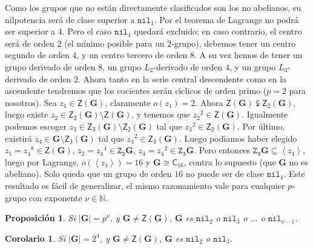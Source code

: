 \documentclass[final,12pt,a4paper,twoside,fleqn]{extbook}
\newcommand{\entreparentesis}[1]{\ensuremath{
        \left({#1}\right)
}}
\newcommand{\entreangulos}[1]{\ensuremath{\left\langle{#1}\right\rangle}}
\newcommand{\setN}{\ensuremath{\mathds{N}}}
\newcommand{\generadoporUitem}[1]{\ensuremath{
        \entreangulos{#1}
}}
\newcommand{\generadopor}[1]{\ensuremath{
        \generadoporUitem{#1}
}}
\newcommand{\grG}{\ensuremath{\mathbf{G}}}
\newcommand{\grclass}[1]{\ensuremath{\mathsf{#1}}}
\newcommand{\cyclicgr}[1]{\ensuremath{{\grclass{C}}_{#1}}}
\newcommand{\centro}[1]{\ensuremath{
        {\mathsf{Z}}
        {\left({#1}\right)}
}}
\newtheorem{cor}[thm]{Corolario}
\newtheorem{prop}[thm]{Proposici\'on}
\theoremstyle{definition}
\theoremstyle{remark}
\begin{document}
Como los grupos que no est\'an directamente clasificados son los no abelianos, su nilpotencia ser\'a de clase superior a $\mathtt{nil}_{1}$.
Por el teorema de Lagrange no podrá ser superior a $4$. Pero el caso $\mathtt{nil}_{4}$ quedar\'a excluido: en caso contrario,
el centro ser\'a de orden $2$ (el mínimo posible para un $2$-grupo), debemos tener un centro segundo de orden $4$,
y un centro tercero de orden $8$. A su vez hemos de tener un grupo derivado de orden $8$, un grupo
$L_2$-derivado de orden $4$, y un grupo $L_3$-derivado de orden $2$. Ahora tanto en la serie central
descendente como en la ascendente tendremos que los cocientes ser\'an c{\'\i}clicos de
orden primo ($p=2$ para nosotros). Sea $z_1          \in \centro{\grG}$, claramente $o(z_1)=2$.
Ahora $\centro{\grG}\subsetneqq\mathsf{Z_2}\entreparentesis{\grG}$, luego existe
${z_2}          \in {\mathsf{Z_2}\entreparentesis{\grG}}\setminus{\centro{\grG}}$,
y tenemos que ${z_2}^2         \in \centro{\grG}$.
Igualmente podemos escoger
$z_3          \in {\mathsf{Z_3}\entreparentesis{\grG}}\setminus{\mathsf{Z_2}\entreparentesis{\grG}}$
tal que ${z_3}^2         \in {\mathsf{Z_2}\entreparentesis{\grG}}$. Por \'ultimo, existir\'a
$z_4          \in {\grG}\setminus{\mathsf{Z_3}\entreparentesis{\grG}}$ tal que
${z_4}^2         \in {\mathsf{Z_3}\entreparentesis{\grG}}$. Luego pod{\'\i}amos haber elegido
$z_1={z_4}^8         \in \centro{\grG}$,
$z_2={z_4}^4         \in {\mathtt{Z_2}{\grG}}$, $z_3={z_4}^2         \in {\mathtt{Z_3}{\grG}}$. Pero entonces
${\mathtt{Z_3}{\grG}}         \subseteq \generadopor{z_4}$, luego por Lagrange,
$o(\generadopor{z_4})=16$ y $\grG         \cong         \cyclicgr{16}$, contra lo supuesto
(que $\grG$ no es abeliano). Solo queda que un grupo de orden $16$ no puede ser de clase
$\mathtt{nil}_4$. Este resultado es f\'acil de generalizar, el mismo razonamiento vale para
cualquier $p$-grupo con exponente $\nu         \in \setN$.
\par
\begin{prop}
Si ${\left|{\grG}\right|}=p^\nu$, y $\grG          \neq          \centro{\grG}$, $\grG$ es $\mathtt{nil}_2$ o
$\mathtt{nil}_3$ o $\ldots$ o $\mathtt{nil}_{\nu-1}$.
\end{prop}
\par
\begin{cor}
Si ${\left|{\grG}\right|}=2^4$, y $\grG          \neq          \centro{\grG}$, $\grG$ es $\mathtt{nil}_2$ o
$\mathtt{nil}_3$.
\end{cor}
\par
\end{document}
